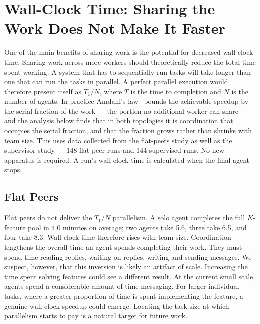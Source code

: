 \documentclass[11pt,a4paper]{article}
\begin{document}
%
%
\FloatBarrier
\section{Wall-Clock Time: Sharing the Work Does Not Make It Faster}\label{sec:wallclock}

One of the main benefits of sharing work is the potential for decreased wall-clock time. Sharing work across more workers should theoretically reduce the total time spent working. A system that has to sequentially run tasks will take longer than one that can run the tasks in parallel. A perfect parallel execution would therefore present itself as $T_1/N$, where $T$ is the time to completion and $N$ is the number of agents. In practice Amdahl's law~\cite{amdahl1967validity} bounds the achievable speedup by the serial fraction of the work --- the portion no additional worker can share --- and the analysis below finds that in both topologies it is coordination that occupies the serial fraction, and that the fraction grows rather than shrinks with team size. This uses data collected from the flat-peers study as well as the supervisor study --- 148 flat-peer runs and 144 supervised runs. No new apparatus is required. A run's wall-clock time is calculated when the final agent stops.

\FloatBarrier
\subsection{Flat Peers}\label{sec:wallflat}

Flat peers do not deliver the $T_1/N$ parallelism. A solo agent completes the full $K$-feature pool in 4.0 minutes on average; two agents take 5.6, three take 6.5, and four take 8.3. Wall-clock time therefore rises with team size. Coordination lengthens the overall time an agent spends completing their work. They must spend time reading replies, waiting on replies, writing and sending messages. We suspect, however, that this inversion is likely an artifact of scale. Increasing the time spent solving features could see a different result. At the current small scale, agents spend a considerable amount of time messaging. For larger individual tasks, where a greater proportion of time is spent implementing the feature, a genuine wall-clock speedup could emerge. Locating the task size at which parallelism starts to pay is a natural target for future work.
\end{document}
